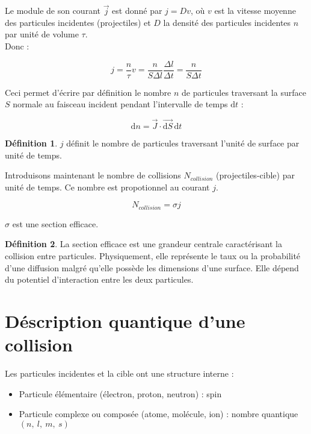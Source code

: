 \documentclass[12pt,a4paper,oneside,french]{book}
\newcommand{\diff}{\mathrm{d}}
\theoremstyle{definition}
\newtheorem*{definition}{Définition}
\theoremstyle{definition}
\theoremstyle{definition}
\theoremstyle{remark}
\theoremstyle{definition}
\begin{document}
   Le module de son courant $\vec{j}$ est donné par $j = D v$, où $v$ est la vitesse moyenne des particules incidentes (projectiles) et $D$ la densité des particules incidentes $n$ par unité de volume $\tau$. \\
    
    Donc :
    
    \begin{equation*}
        j = \frac{n}{\tau} v = \frac{n}{S \Delta l} \frac{\Delta l}{\Delta t} = \frac{n}{S \Delta t}
    \end{equation*}
    
    Ceci permet d'écrire par définition le nombre $n$ de particules traversant la surface $S$ normale au faisceau incident pendant l'intervalle de temps $\diff t$ :
    
    \begin{equation*}
        \diff n = \vec{J} \cdot \vec{\diff S} \, \diff t
    \end{equation*}
    
    \begin{definition}
        $j$ définit le nombre de particules traversant l'unité de surface par unité de temps.
    \end{definition}
    
    Introduisons maintenant le nombre de collisions ${N}_{collision}$ (projectiles-cible) par unité de temps. Ce nombre est propotionnel au courant $j$.
    
    \begin{equation*}
        {N}_{collision} = \sigma j
    \end{equation*}
    
    $\sigma$ est une section efficace.
    
    \begin{definition}
        La section efficace est une grandeur centrale caractérisant la collision entre particules. Physiquement, elle représente le taux ou la probabilité d'une diffusion malgré qu'elle possède les dimensions d'une surface. Elle dépend du potentiel d'interaction entre les deux particules.
    \end{definition}
    
    \section{Déscription quantique d'une collision}
    Les particules incidentes et la cible ont une structure interne :
    
    \begin{itemize}
        \item 
        Particule élémentaire (électron, proton, neutron) : spin
        
        \item
        Particule complexe ou composée (atome, molécule, ion) : nombre quantique $(n, \ l, \ m, \ s)$
    \end{itemize}
    
\end{document}
